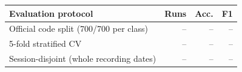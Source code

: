 \begin{tabular}{lrrr}
\toprule
Evaluation protocol & Runs & Acc. & F1 \\
\midrule
Official code split (700/700 per class) & -- & -- & -- \\
5-fold stratified CV & -- & -- & -- \\
Session-disjoint (whole recording dates) & -- & -- & -- \\
\bottomrule
\end{tabular}
